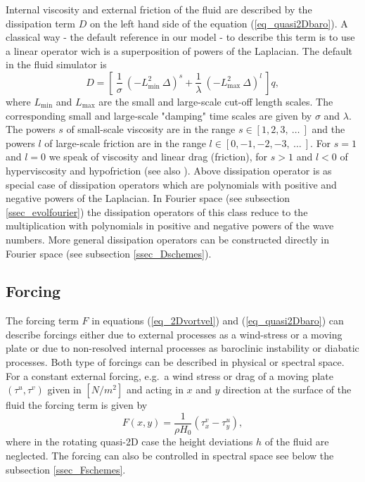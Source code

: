 Internal viscosity and external friction of the fluid are described by 
the dissipation term $D$ on the left hand side of the equation 
(\ref{eq_quasi2Dbaro}). A classical way - the default reference in our
 model - to describe this term is to use a linear operator wich is a
superposition of powers of the Laplacian. 
The default in the fluid simulator is
\begin{equation} \label{eq_dissip}
  D = \left[ \ 
       \frac{1}{\sigma} \ 
       \left(
        - L^{2}_{\mathrm{min}} \  \Delta 
       \right)^{s}
       +
       \frac{1}{\lambda} \ 
       \left(
        - L^{2}_{\mathrm{max}} \  \Delta 
       \right)^{l} \ 
      \right] q,
\end{equation}
where $L_{\mathrm{min}}$ and $L_{\mathrm{max}}$ are the small and 
large-scale cut-off length scales. The corresponding small and 
large-scale "damping" time scales are given by $\sigma$ and $\lambda$.
The powers $s$ of small-scale viscosity are in the range 
$s \in [1,2,3, \ \dots \ ]$ and the powers $l$ of large-scale friction
are in the range $l \in [0,-1,-2,-3, \ \dots \ ]$. For $s = 1$ and 
$l = 0$  we speak of viscosity and linear drag (friction), for
$s > 1$ and $l < 0$ of hyperviscosity and hypofriction          
(see also \cite{danilovandgurarie2001}). Above dissipation operator
is as special case of dissipation operators which are polynomials 
with positive and negative powers of the Laplacian. In Fourier space 
(see subsection \ref{ssec_evolfourier}) the dissipation operators of
this class reduce to the multiplication with polynomials in positive 
and negative powers of the wave numbers. More general dissipation 
operators can be constructed directly in Fourier space 
(see subsection \ref{ssec_Dschemes}).

\subsection{Forcing}
The forcing term $F$ in equations (\ref{eq_2Dvortvel}) and 
(\ref{eq_quasi2Dbaro}) can describe forcings either due to 
external processes as a wind-stress or a moving plate or due 
to non-resolved internal processes as baroclinic 
instability or diabatic processes. Both type of forcings can be described 
in physical or spectral space. For a constant external forcing, 
e.g.\ a wind stress or drag of a moving plate $(\tau^{u},\tau^{v})$ 
given in $[N/m^{2}]$ and acting in $x$ and $y$ direction at the surface 
of the fluid the forcing term is given by 
\begin{equation} \label{eq_Fstressdrag}
 F(x,y) = \frac{1}{\rho H_{0}} \left( \tau_{x}^{v} - \tau_{y}^{u} \right),
\end{equation}
where in the rotating quasi-2D case the height deviations $h$ of the
fluid are neglected. The forcing can also be controlled in spectral
space see below the subsection \ref{ssec_Fschemes}.

